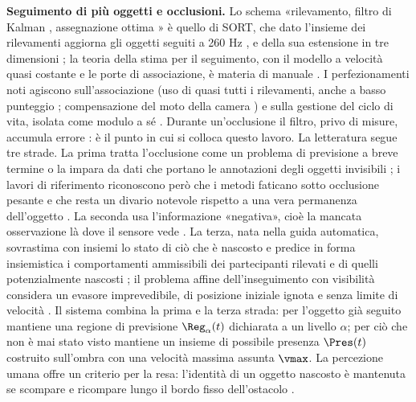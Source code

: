 \textbf{Seguimento di più oggetti e occlusioni.} Lo schema «rilevamento, filtro di Kalman \cite{kalman1960}, assegnazione ottima \cite{kuhn1955}» è quello di SORT, che dato l'insieme dei rilevamenti aggiorna gli oggetti seguiti a 260 Hz \cite{bewley2016}, e della sua estensione in tre dimensioni \cite{weng2020}; la teoria della stima per il seguimento, con il modello a velocità quasi costante e le porte di associazione, è materia di manuale \cite{barshalom2001}. I perfezionamenti noti agiscono sull'associazione (uso di quasi tutti i rilevamenti, anche a basso punteggio \cite{zhang2022}; compensazione del moto della camera \cite{aharon2022}) e sulla gestione del ciclo di vita, isolata come modulo a sé \cite{pang2021}. Durante un'occlusione il filtro, privo di misure, accumula errore \cite{cao2023}: è il punto in cui si colloca questo lavoro. La letteratura segue tre strade. La prima tratta l'occlusione come un problema di previsione a breve termine \cite{khurana2021} o la impara da dati che portano le annotazioni degli oggetti invisibili \cite{tokmakov2021}; i lavori di riferimento riconoscono però che i metodi faticano sotto occlusione pesante \cite{hsieh2023} e che resta un divario notevole rispetto a una vera permanenza dell'oggetto \cite{vanhoorick2023}. La seconda usa l'informazione «negativa», cioè la mancata osservazione là dove il sensore vede \cite{koch2007,wyffels2015,krejci2026}. La terza, nata nella guida automatica, sovrastima con insiemi lo stato di ciò che è nascosto \cite{orzechowski2018} e predice in forma insiemistica i comportamenti ammissibili dei partecipanti rilevati e di quelli potenzialmente nascosti \cite{koschi2021}; il problema affine dell'inseguimento con visibilità considera un evasore imprevedibile, di posizione iniziale ignota e senza limite di velocità \cite{guibas1997}. Il sistema combina la prima e la terza strada: per l'oggetto già seguito mantiene una regione di previsione $\Reg_\alpha(t)$ dichiarata a un livello $\alpha$; per ciò che non è mai stato visto mantiene un insieme di possibile presenza $\Pres(t)$ costruito sull'ombra con una velocità massima assunta $\vmax$. La percezione umana offre un criterio per la resa: l'identità di un oggetto nascosto è mantenuta se scompare e ricompare lungo il bordo fisso dell'ostacolo \cite{scholl1999}.

